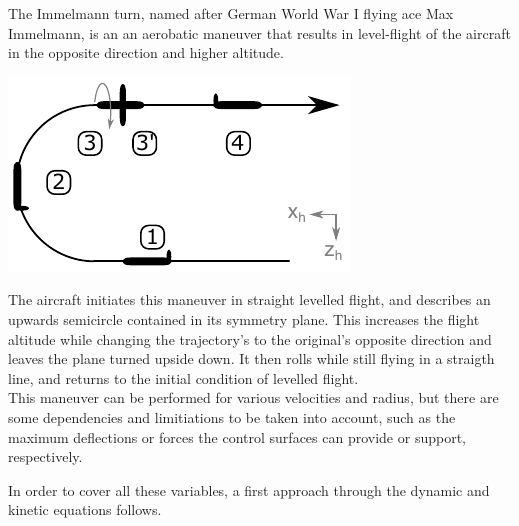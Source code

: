 \vspace{-0.5cm}
The Immelmann turn, named after German World War I flying ace Max Immelmann, is an an  aerobatic maneuver that results in level-flight of the aircraft in the opposite direction and higher altitude.

\includegraphics[width=\linewidth]{figures/immelmann-overview}
\label{fig:immelmann-overview}
\vspace*{0.5cm}

The aircraft initiates this maneuver in straight levelled flight, and describes an upwards semicircle contained in its symmetry plane. This increases the flight altitude while changing the trajectory's to the original's opposite direction and leaves the plane turned upside down. It then rolls while still flying in a straigth line, and returns to the initial condition of levelled flight.\\

This maneuver can be performed for various velocities and radius, but there are some dependencies and limitiations to be taken into account, such as the maximum deflections or forces the control surfaces can provide or support, respectively.

In order to cover all these variables, a first approach through the dynamic and kinetic equations follows.

